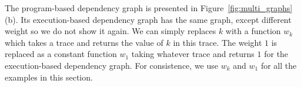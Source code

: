 \begin{example}
The program-based dependency graph is presented  in Figure~\ref{fig:multi_graphs}(b). Its execution-based dependency graph has the same graph, except different weight so we do not show it again. We can simply replaces $k$ with a function $w_k$ which takes a trace and returns the value of $k$ in this trace. The weight $1$ is replaced as a constant function $w_1$ taking whatever trace and returns $1$ for the execution-based dependency graph. For consistence, we use $w_k$ and $w_1$ for all the examples in this section.

\end{example}
